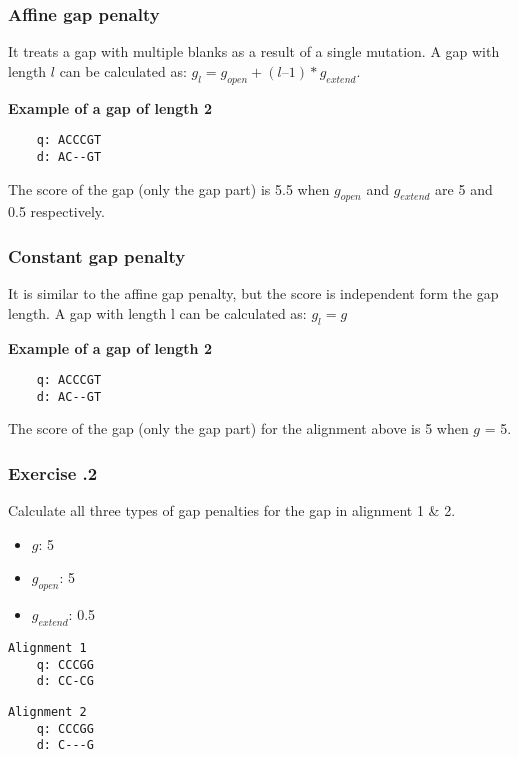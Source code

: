 %
%
\subsubsection*{Affine gap penalty}
It treats a gap with multiple blanks as a result of a single mutation. A gap with length $l$ can be calculated as: $g_l = g_{open} + (l – 1) * g_{extend}$.
\medskip 

\noindent
\textbf{Example of a gap of length 2}
\begin{verbatim}
    q: ACCCGT
    d: AC--GT
\end{verbatim}
The score of the gap (only the gap part) is 5.5 when $g_{open}$ and $g_{extend}$ are 5 and 0.5 respectively. 

%
%
\subsubsection*{Constant gap penalty}
It is similar to the affine gap penalty, but the score is independent form the gap length. A gap with length l can be calculated as: $g_l = g$ 
\medskip 

\noindent
\textbf{Example of a gap of length 2}
\begin{verbatim}
    q: ACCCGT
    d: AC--GT
\end{verbatim}
The score of the gap (only the gap part) for the alignment above is 5 when $g$ = 5. 

%
%
\subsubsection*{Exercise \thesection.2}
Calculate all three types of gap penalties for the gap in alignment 1 \& 2.

\begin{itemize}
\item $g$: 5
\item $g_{open}$: 5
\item $g_{extend}$: 0.5
\end{itemize}

\begin{multicols}{2}
\begin{verbatim}
Alignment 1
    q: CCCGG 
    d: CC-CG
\end{verbatim}

\begin{verbatim}
Alignment 2 
    q: CCCGG
    d: C---G
\end{verbatim}
\end{multicols}

%
